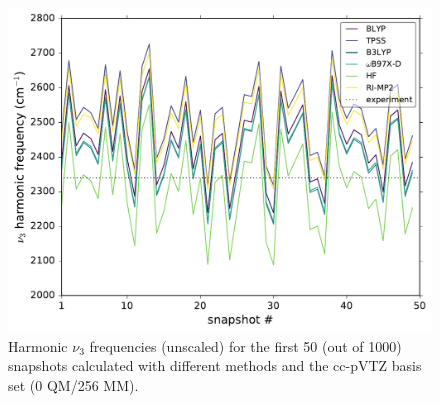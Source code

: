 \documentclass[%
  class = book,%
  crop = false,%
  float = true,%
  multi = true,%
  preview = false,%
]{standalone}
\begin{document}
\begin{figure}
  \centering
  \includegraphics[width=\textwidth]{trajectory_frequencies_cc-pvtz.pdf}
  \caption[Instantaneous method and basis set dependence of MD snapshots]{Harmonic \(\nu_{3}\) frequencies (unscaled) for the first \num{50} (out of \num{1000}) snapshots calculated with different methods and the cc-pVTZ basis set (0 QM/256 MM).}
  \label{paper_02:fig:S4}
\end{figure}
\end{document}
